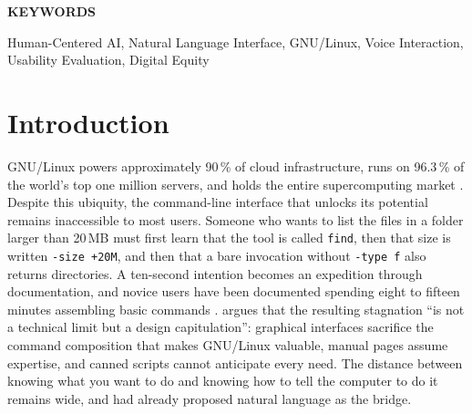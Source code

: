 \documentclass[10pt,a4paper]{article}
\begin{document}
\vspace{18pt}

{
\noindent\fontsize{9}{10.8}\bfseries KEYWORDS\par
\vspace{6pt}
\normalfont\fontsize{10}{12}\selectfont
\noindent
Human-Centered AI, Natural Language Interface, GNU/Linux, Voice Interaction, Usability Evaluation, Digital Equity\par
}

\vspace{12pt}

\section{Introduction}
\label{sec:introduction}

GNU/Linux powers approximately 90\,\% of cloud infrastructure, runs on 96.3\,\% of the world's top one million servers, and holds the entire supercomputing market \citep{W3Techs2023, Top5002023}. Despite this ubiquity, the command-line interface that unlocks its potential remains inaccessible to most users. Someone who wants to list the files in a folder larger than 20\,MB must first learn that the tool is called \texttt{find}, then that size is written \texttt{-size +20M}, and then that a bare invocation without \texttt{-type f} also returns directories. A ten-second intention becomes an expedition through documentation, and novice users have been documented spending eight to fifteen minutes assembling basic commands \citep{Norman2013}. \citet{Jenson2024} argues that the resulting stagnation ``is not a technical limit but a design capitulation'': graphical interfaces sacrifice the command composition that makes GNU/Linux valuable, manual pages assume expertise, and canned scripts cannot anticipate every need. The distance between knowing what you want to do and knowing how to tell the computer to do it remains wide, and \citet{ShneidermanPlaisant2010} had already proposed natural language as the bridge.
\end{document}
